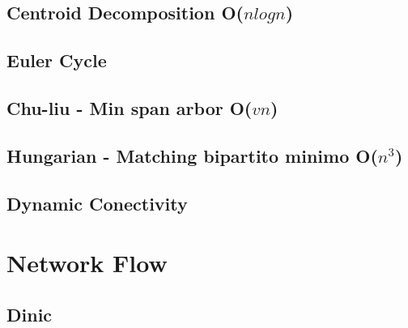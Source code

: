 \subsection{Centroid Decomposition O($n log n$)} %
\subsection{Euler Cycle}
\subsection{Chu-liu - Min span arbor O($v n$)}
\subsection{Hungarian - Matching bipartito minimo O($n^3$)}
\subsection{Dynamic Conectivity}


\section{Network Flow}%
\subsection{Dinic}
